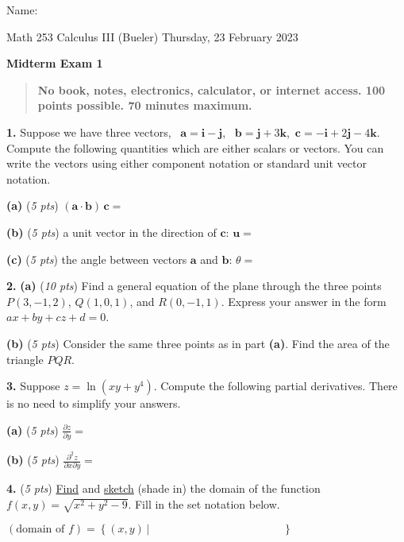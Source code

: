 \documentclass[11pt]{amsart}
\newcommand{\ba}{\mathbf{a}}
\newcommand{\bb}{\mathbf{b}}
\newcommand{\bc}{\mathbf{c}}
\newcommand{\bi}{\mathbf{i}}
\newcommand{\bj}{\mathbf{j}}
\newcommand{\bk}{\mathbf{k}}
\newcommand{\bu}{\mathbf{u}}
\newcommand{\ds}{\displaystyle}
\newcommand{\prob}[1]{\bigskip\noindent\textbf{#1.} }
\newcommand{\pts}[1]{(\emph{#1 pts})}
\newcommand{\probpts}[2]{\prob{#1} \pts{#2} \quad}
\newcommand{\ppartpts}[2]{\textbf{(#1)} \pts{#2} \quad}
\newcommand{\epartpts}[2]{\medskip\noindent \textbf{(#1)} \pts{#2} \quad}
\begin{document}
\hfill \Large Name:\underline{\phantom{Ed Bueler really really long long long name}}
\medskip

\scriptsize \noindent Math 253 Calculus III (Bueler) \hfill Thursday, 23 February 2023
\medskip

\LARGE\centerline{\textbf{Midterm Exam 1}}

\smallskip
\begin{quote}
\large
\textbf{No book, notes, electronics, calculator, or internet access.  100 points possible.  70 minutes maximum.}
\end{quote}

\normalsize
\medskip

\thispagestyle{empty}

\prob{1}  Suppose we have three vectors, \, $\ba = \bi - \bj$, \, $\bb = \bj + 3\bk$,\, $\bc=-\bi+2\bj-4\bk$.  Compute the following quantities which are either scalars or vectors.  You can write the vectors using either component notation or standard unit vector notation.

\epartpts{a}{5} $(\ba\cdot \bb) \,\bc=$
\vfill

\epartpts{b}{5} a unit vector in the direction of $\bc$: \quad $\bu=$
\vfill

\epartpts{c}{5} the angle between vectors $\ba$ and $\bb$: \quad $\theta=$
\vfill

\clearpage\newpage
\prob{2} \ppartpts{a}{10}  Find a general equation of the plane through the three points $P(3,-1,2)$, $Q(1,0,1)$, and $R(0,-1,1)$.  Express your answer in the form $ax+by+cz+d=0$. %
\vfill

\epartpts{b}{5}  Consider the same three points as in part \textbf{(a)}.  Find the area of the triangle $PQR$.  %
\vspace{3.0in}

\clearpage\newpage
\prob{3}  Suppose $z = \ln(xy + y^4)$.  Compute the following partial derivatives.  There is no need to simplify your answers.

\medskip
\epartpts{a}{5}  \quad $\ds \frac{\partial z}{\partial y}=$
\vfill

\epartpts{b}{5}  \quad $\ds \frac{\partial^2 z}{\partial x \partial y}=$
\vfill

\probpts{4}{5}  \underline{Find} and \underline{sketch} (shade in) the domain of the function $f(x,y) = \sqrt{x^2 + y^2 - 9}$.  Fill in the set notation below.

\bigskip\medskip
$\ds (\text{domain of } f) = \left\{(x,y)\,\Big|\, \phantom{kldsfjklajsdkjklj sdfjasdfl} \right\}$
\vfill
\end{document}
